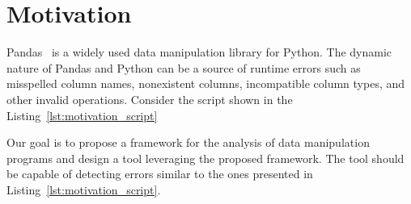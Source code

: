 \section{Motivation}

Pandas~\cite{pandas_docs} is a widely used data manipulation library for Python.
The dynamic nature of Pandas and Python can be a source of runtime errors such as misspelled column names, nonexistent
columns, incompatible column types, and other invalid operations.
Consider the script shown in the Listing~\ref{lst:motivation_script}



Our goal is to propose a framework for the analysis of data manipulation programs and design a tool
leveraging the proposed framework.
The tool should be capable of detecting errors similar to the ones presented in Listing~\ref{lst:motivation_script}.

